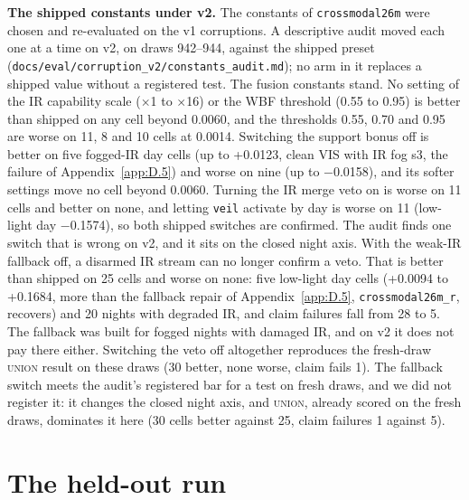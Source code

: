 \documentclass[journal,onecolumn]{IEEEtran}
\begin{document}
\textbf{The shipped constants under v2.} The constants of \texttt{crossmodal26m} were chosen and re-evaluated on the v1 corruptions. A descriptive audit moved each one at a time on v2, on draws 942--944, against the shipped preset (\texttt{docs/\allowbreak{}eval/\allowbreak{}corruption\_\allowbreak{}v2/\allowbreak{}constants\_\allowbreak{}audit.md}); no arm in it replaces a shipped value without a registered test. The fusion constants stand. No setting of the IR capability scale ($\times$1 to $\times$16) or the WBF threshold (0.55 to 0.95) is better than shipped on any cell beyond 0.0060, and the thresholds 0.55, 0.70 and 0.95 are worse on 11, 8 and 10 cells at 0.0014. Switching the support bonus off is better on five fogged-IR day cells (up to +0.0123, clean VIS with IR fog s3, the failure of Appendix~\ref{app:D.5}) and worse on nine (up to $-$0.0158), and its softer settings move no cell beyond 0.0060. Turning the IR merge veto on is worse on 11 cells and better on none, and letting \texttt{veil} activate by day is worse on 11 (low-light day $-$0.1574), so both shipped switches are confirmed. The audit finds one switch that is wrong on v2, and it sits on the closed night axis. With the weak-IR fallback off, a disarmed IR stream can no longer confirm a veto. That is better than shipped on 25 cells and worse on none: five low-light day cells (+0.0094 to +0.1684, more than the fallback repair of Appendix~\ref{app:D.5}, \texttt{crossmodal26m\_\allowbreak{}r}, recovers) and 20 nights with degraded IR, and claim failures fall from 28 to 5. The fallback was built for fogged nights with damaged IR, and on v2 it does not pay there either. Switching the veto off altogether reproduces the fresh-draw \textsc{union} result on these draws (30 better, none worse, claim fails 1). The fallback switch meets the audit's registered bar for a test on fresh draws, and we did not register it: it changes the closed night axis, and \textsc{union}, already scored on the fresh draws, dominates it here (30 cells better against 25, claim failures 1 against 5).

\FloatBarrier
\section{The held-out run}\label{app:G}
\end{document}
